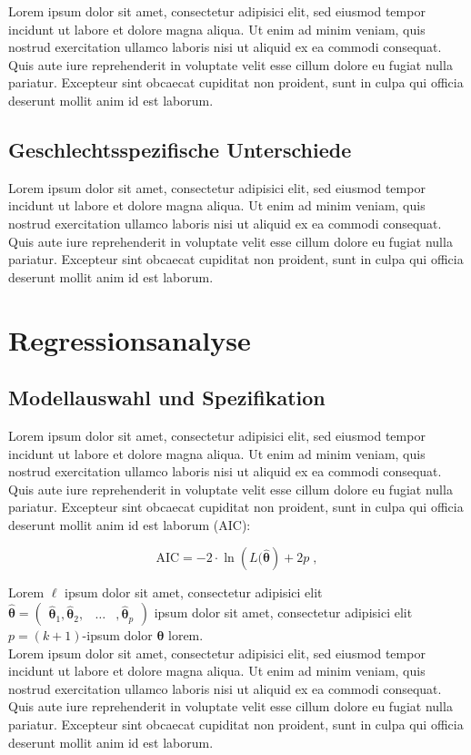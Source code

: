 %
Lorem ipsum dolor sit amet, consectetur adipisici elit, sed eiusmod tempor incidunt ut labore et dolore magna aliqua. Ut enim ad minim veniam, quis nostrud exercitation ullamco laboris nisi ut aliquid ex ea commodi consequat. Quis aute iure reprehenderit in voluptate velit esse cillum dolore eu fugiat nulla pariatur. Excepteur sint obcaecat cupiditat non proident, sunt in culpa qui officia deserunt mollit anim id est laborum.

\subsection{Geschlechtsspezifische Unterschiede}
Lorem ipsum dolor sit amet, consectetur adipisici elit, sed eiusmod tempor incidunt ut labore et dolore magna aliqua. Ut enim ad minim veniam, quis nostrud exercitation ullamco laboris nisi ut aliquid ex ea commodi consequat. Quis aute iure reprehenderit in voluptate velit esse cillum dolore eu fugiat nulla pariatur. Excepteur sint obcaecat cupiditat non proident, sunt in culpa qui officia deserunt mollit anim id est laborum.

\section{Regressionsanalyse}
\subsection{Modellauswahl und Spezifikation}
Lorem ipsum dolor sit amet, consectetur adipisici elit, sed eiusmod tempor incidunt ut labore et dolore magna aliqua. Ut enim ad minim veniam, quis nostrud exercitation ullamco laboris nisi ut aliquid ex ea commodi consequat. Quis aute iure reprehenderit in voluptate velit esse cillum dolore eu fugiat nulla pariatur. Excepteur sint obcaecat cupiditat non proident, sunt in culpa qui officia deserunt mollit anim id est laborum (\ac{AIC}):

\begin{equation*}
\text{AIC}=-2\cdot \ln \left(L(\hat{\boldsymbol{\theta}}\right)+2p\;,
\end{equation*}

Lorem $\ell$ ipsum dolor sit amet, consectetur adipisici elit $\hat{\boldsymbol{\theta}}=\begin{pmatrix} \hat{\mathbf{\theta}}_1,\hat{\mathbf{\theta}}_2, & \ldots &, \hat{\mathbf{\theta}}_p\end{pmatrix}$ ipsum dolor sit amet, consectetur adipisici elit $p=(k+1)$-ipsum dolor $\boldsymbol{\theta}$ lorem.\\ Lorem ipsum dolor sit amet, consectetur adipisici elit, sed eiusmod tempor incidunt ut labore et dolore magna aliqua. Ut enim ad minim veniam, quis nostrud exercitation ullamco laboris nisi ut aliquid ex ea commodi consequat. Quis aute iure reprehenderit in voluptate velit esse cillum dolore eu fugiat nulla pariatur. Excepteur sint obcaecat cupiditat non proident, sunt in culpa qui officia deserunt mollit anim id est laborum.

